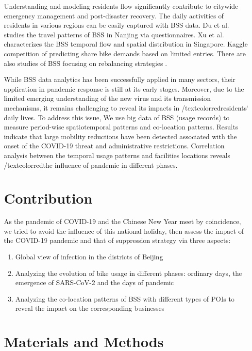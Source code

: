 \documentclass[preprints,ijgi,submit,moreauthors]{Definitions/mdpi}
\begin{document}
Understanding and modeling residents flow significantly contribute to citywide emergency management and post-disaster recovery.
The daily activities of residents in various regions can be easily captured with BSS data. %
Du et al. \cite{du2018better} studies the travel patterns of BSS in Nanjing via questionnaires.
Xu et al. \cite{xu2019unravel} characterizes the BSS temporal flow and spatial distribution in Singapore.
Kaggle \cite{kaggle} competition of predicting share bike demands based on limited entries.
There are also studies of BSS focusing on rebalancing strategies \cite{pal2017free, ai2019deep}.

While BSS data analytics has been successfully applied in many sectors, their application in pandemic response is still at its early stages.
Moreover, due to the limited emerging understanding of the new virus and its transmission mechanisms, it remains challenging to reveal its impacts in /textcolor{red}{residents' daily lives}.
To address this issue, We use big data of BSS (usage records) to measure period-wise spatiotemporal patterns and co-location patterns. 
Results indicate that large mobility reductions have been detected associated with the onset of the COVID-19 threat and administrative restrictions.
Correlation analysis between the temporal usage patterns and facilities locations reveals /textcolor{red}{the influence of pandemic in different phases.} 

\section*{Contribution} As the pandemic of COVID-19 and the Chinese New Year meet by coincidence, we tried to avoid the influence of this national holiday, then assess the impact of the COVID-19 pandemic and that of suppression strategy via three aspects:
\begin{enumerate}
    \item Global view of infection in the districts of Beijing
    \item Analyzing the evolution of bike usage in different phases: ordinary days, the emergence of SARS-CoV-2 and the days of pandemic 
    \item Analyzing the co-location patterns of BSS with different types of POIs to reveal the impact on the corresponding businesses
\end{enumerate}



\section{Materials and Methods}
\end{document}
